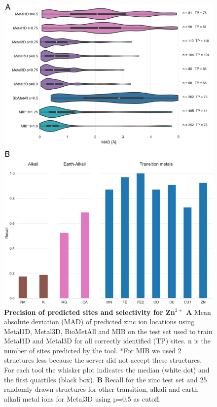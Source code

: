 \documentclass[ lineno,
  9pt]{elife}
\begin{document}
\begin{figure}
\hypertarget{fig:selectivity-mad}{%
\centering
\includegraphics{images/Figure3_selectivity_mad.png}
\caption{\textbf{Precision of predicted sites and selectivity for Zn$^{2+}$} \textbf{A} Mean absolute deviation (MAD) of predicted zinc ion locations using Metal1D, Metal3D, BioMetAll and MIB on the test set used to train Metal1D and Metal3D for all correctly identified (TP) sites. n is the number of sites predicted by the tool. *For MIB we used 2 structures less because the server did not accept these structures. For each tool the whisker plot indicates the median (white dot) and the first quartiles (black box). \textbf{B} Recall for the zinc test set and 25 randomly drawn structures for other transition, alkali and earth-alkali metal ions for Metal3D using p=0.5 as cutoff.}\label{fig:selectivity-mad}
}
\end{figure}
\end{document}

